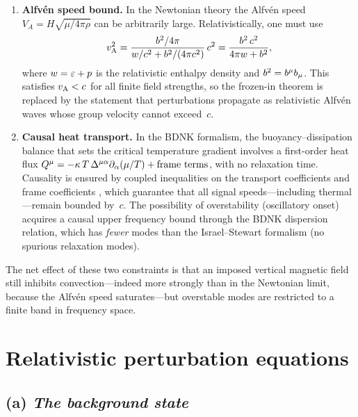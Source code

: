 \begin{enumerate}
\item \textbf{Alfv\'en speed bound.}  In the Newtonian theory the
  Alfv\'en speed $V_{A}=H\sqrt{\mu/4\pi\rho}$ can be arbitrarily
  large.  Relativistically, one must use
  \begin{equation}\label{eq:rel-vA}
    v_{\mathrm{A}}^{2}
    = \frac{b^2/4\pi}{w/c^{2}+b^2/(4\pi c^{2})}\,c^{2}
    = \frac{b^2\,c^{2}}{4\pi w+b^2},
  \end{equation}
  where $w=\varepsilon+p$ is the relativistic enthalpy density
  and $b^2=b^{\mu}b_{\mu}$.  This satisfies $v_{\mathrm{A}}<c$ for all
  finite field strengths, so the frozen-in theorem is replaced by
  the statement that perturbations propagate as relativistic Alfv\'en
  waves whose group velocity cannot exceed~$c$.

\item \textbf{Causal heat transport.}  In the BDNK formalism,
  the buoyancy--dissipation balance that sets the critical temperature
  gradient involves a first-order heat flux
  $Q^{\mu} = -\kappa\,T\,\Delta^{\mu\alpha}\partial_{\alpha}(\mu/T)
  + \text{frame terms}$,
  with no relaxation time.  Causality is ensured by coupled inequalities
  on the transport coefficients and frame coefficients
  \citep{BemficaDN2018,Kovtun2019}, which guarantee that all signal
  speeds---including thermal---remain bounded by~$c$.  The possibility
  of overstability (oscillatory onset) acquires a causal upper
  frequency bound through the BDNK dispersion relation, which has
  \emph{fewer} modes than the Israel--Stewart formalism (no spurious
  relaxation modes).
\end{enumerate}

\noindent
The net effect of these two constraints is that an imposed vertical
magnetic field still inhibits convection---indeed more strongly than
in the Newtonian limit, because the Alfv\'en speed saturates---but
overstable modes are restricted to a finite band in frequency space.

\section{Relativistic perturbation equations}
\label{sec:rel-42}

\subsection*{(a) \emph{The background state}}


